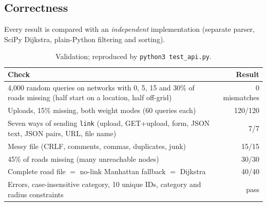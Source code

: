 \documentclass[11pt,a4paper]{article}
\newcommand{\code}[1]{\texttt{#1}}
\begin{document}
\subsection{Correctness}
Every result is compared with an \emph{independent} implementation (separate parser, SciPy Dijkstra, plain-Python filtering and sorting).
\begin{table}[h]\centering\small
\begin{tabular}{@{}p{10.4cm}r@{}}\toprule
\textbf{Check} & \textbf{Result}\\\midrule
4{,}000 random queries on networks with 0, 5, 15 and 30\% of roads missing (half start on a location, half off-grid) & 0 mismatches\\
Uploads, 15\% missing, both weight modes (60 queries each) & 120/120\\
Seven ways of sending \code{link} (upload, GET+upload, form, JSON text, JSON pairs, URL, file name) & 7/7\\
Messy file (CRLF, comments, commas, duplicates, junk) & 15/15\\
45\% of roads missing (many unreachable nodes) & 30/30\\
Complete road file $=$ no-link Manhattan fallback $=$ Dijkstra & 40/40\\
Errors, case-insensitive category, 10 unique IDs, category and radius constraints & pass\\\bottomrule
\end{tabular}
\caption{Validation; reproduced by \code{python3 test\_api.py}.}
\end{table}
\end{document}
